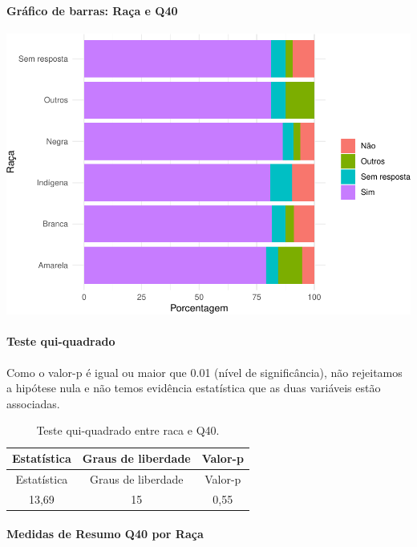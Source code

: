 \documentclass[]{article}
\let\oldparagraph\paragraph
\renewcommand{\paragraph}[1]{\oldparagraph{#1}\mbox{}}
\begin{document}
\hypertarget{gruxe1fico-de-barras-rauxe7a-e-q40}{%
\paragraph{Gráfico de barras: Raça e Q40}\label{gruxe1fico-de-barras-rauxe7a-e-q40}}

\begin{center}\includegraphics[width=0.75\linewidth]{relatorio_covid19_files/figure-latex/unnamed-chunk-1578-1} \end{center}

\hypertarget{teste-qui-quadrado-135}{%
\paragraph{Teste qui-quadrado}\label{teste-qui-quadrado-135}}

Como o valor-p é igual ou maior que 0.01 (nível de significância), não rejeitamos a hipótese nula e não temos evidência estatística que as duas variáveis estão associadas.

\begin{longtable}[]{@{}ccc@{}}
\caption{\label{tab:unnamed-chunk-1580}Teste qui-quadrado entre raca e Q40.}\tabularnewline
\toprule
Estatística & Graus de liberdade & Valor-p\tabularnewline
\midrule
\endfirsthead
\toprule
Estatística & Graus de liberdade & Valor-p\tabularnewline
\midrule
\endhead
13,69 & 15 & 0,55\tabularnewline
\bottomrule
\end{longtable}

\cleardoublepage

\hypertarget{medidas-de-resumo-q40-por-rauxe7a}{%
\paragraph{Medidas de Resumo Q40 por Raça}\label{medidas-de-resumo-q40-por-rauxe7a}}
\end{document}
